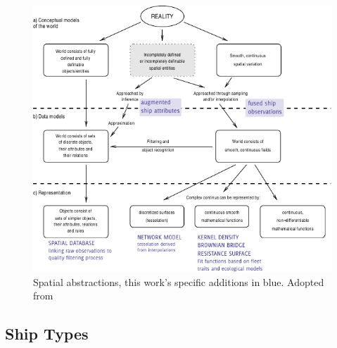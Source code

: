 \begin{figure}[htbp]
  \centering
  \includegraphics[width=160mm]{figures/representation-in-gis.pdf}
  \caption{Spatial abstractions, this work's specific {\color{DBlue} additions in blue}. Adopted from \cite{Bivand2011}}
  \label{fig:representation-in-gis}
\end{figure}



\subsection{Ship Types}


